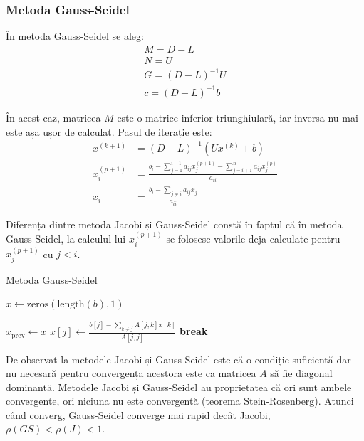 \documentclass{exam}
\begin{document}
\subsubsection{Metoda Gauss-Seidel}

În metoda Gauss-Seidel se aleg:
\begin{gather*}
	M = D - L \\
	N = U \\
	G = (D - L)^{-1} U \\
	c = (D - L)^{-1} b
\end{gather*}

În acest caz, matricea $M$ este o matrice inferior triunghiulară, iar inversa
nu mai este așa ușor de calculat. Pasul de iterație este:
\begin{align*}
	x^{(k + 1)} & = (D - L)^{-1}(Ux^{(k)} + b)                                                                         \\
	x_i^{(p+1)} & = \frac{b_i - \sum_{j = 1}^{i-1} a_{ij} x_j^{(p+1)} - \sum_{j = i + 1}^{n} a_{ij} x_j^{(p)}}{a_{ii}} \\
	x_i         & = \frac{b_i - \sum_{j \neq i}^{} a_{ij} x_j}{a_{ii}}
\end{align*}

Diferența dintre metoda Jacobi și Gauss-Seidel constă în faptul că în metoda
Gauss-Seidel, la calculul lui $x_i^{(p+1)}$ se folosesc valorile deja calculate
pentru $x_j^{(p+1)}$ cu $j < i$.


\begin{algorithm}
	\caption{Metoda Gauss-Seidel}
	\begin{algorithmic}[1]
		\State \( x \gets \text{zeros}(\text{length}(b),1) \) 

		\State \( x_{\text{prev}} \gets x \)
		\State \( x[j] \gets \frac{b[j] - \sum_{k \neq j}^{} A[j,k] x[k]}{A[j,j]} \)
		\EndFor
		\State \textbf{break}
		\EndIf
		\EndFor
	\end{algorithmic}
\end{algorithm}

De observat la metodele Jacobi și Gauss-Seidel este că o condiție suficientă dar
nu necesară pentru convergența acestora este ca matricea $A$ să fie diagonal
dominantă. Metodele Jacobi și Gauss-Seidel au proprietatea că ori sunt ambele
convergente, ori niciuna nu este convergentă (teorema Stein-Rosenberg). Atunci
când converg, Gauss-Seidel converge mai rapid decât Jacobi, $\rho(GS) < \rho(J) < 1$.
\end{document}
